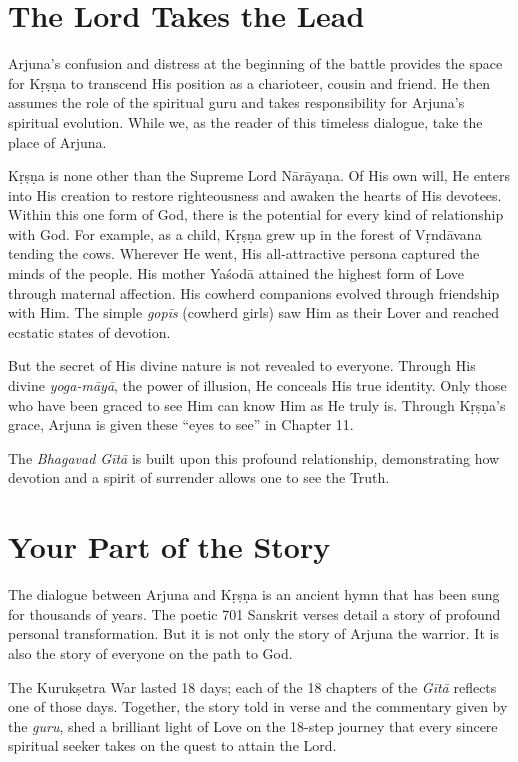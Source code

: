 \section{The Lord Takes the Lead}\label{sec-the-lord-takes-the-lead}

Arjuna’s confusion and distress at the beginning of the battle provides the space for Kṛṣṇa to transcend His position as a charioteer, cousin and friend. He then assumes the role of the spiritual guru and takes responsibility for Arjuna’s spiritual evolution. While we, as the reader of this timeless dialogue, take the place of Arjuna.

Kṛṣṇa is none other than the Supreme Lord Nārāyaṇa. Of His own will, He enters into His creation to restore righteousness and awaken the hearts of His devotees. Within this one form of God, there is the potential for every kind of relationship with God. For example, as a child, Kṛṣṇa grew up in the forest of Vṛndāvana tending the cows. Wherever He went, His all-attractive persona captured the minds of the people. His mother Yaśodā attained the highest form of Love through maternal affection. His cowherd companions evolved through friendship with Him. The simple \textit{gopīs} (cowherd girls) saw Him as their Lover and reached ecstatic states of devotion.

But the secret of His divine nature is not revealed to everyone. Through His divine \textit{yoga-māyā}, the power of illusion, He conceals His true identity. Only those who have been graced to see Him can know Him as He truly is. Through Kṛṣṇa’s grace, Arjuna is given these \enquote{eyes to see} in Chapter 11. 

The \textit{Bhagavad Gītā} is built upon this profound relationship, demonstrating how devotion and a spirit of surrender allows one to see the Truth.

\section{Your Part of the Story}\label{sec-your-part-of-the-story}
The dialogue between Arjuna and Kṛṣṇa is an ancient hymn that has been sung for thousands of years. The poetic 701 Sanskrit verses detail a story of profound personal transformation. But it is not only the story of Arjuna the warrior. It is also the story of everyone on the path to God.

The Kurukṣetra War lasted 18 days; each of the 18 chapters of the \textit{Gītā} reflects one of those days. Together, the story told in verse and the commentary given by the \textit{guru}, shed a brilliant light of Love on the 18-step journey that every sincere spiritual seeker takes on the quest to attain the Lord.


